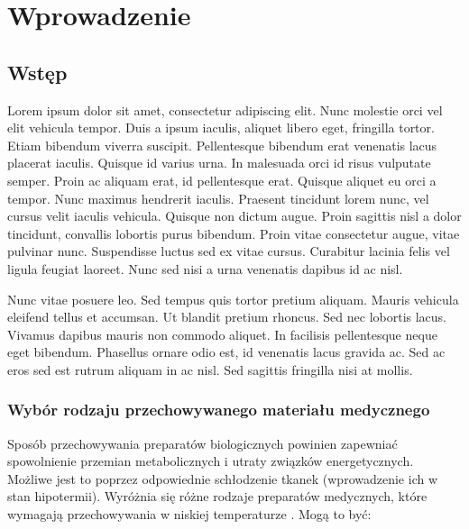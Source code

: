 \chapter{Wprowadzenie}

\section{Wstęp}
Lorem ipsum dolor sit amet, consectetur adipiscing elit. Nunc molestie orci vel elit vehicula tempor. Duis a ipsum iaculis, aliquet libero eget, fringilla tortor. Etiam bibendum viverra suscipit. Pellentesque bibendum erat venenatis lacus placerat iaculis. Quisque id varius urna. In malesuada orci id risus vulputate semper. Proin ac aliquam erat, id pellentesque erat. Quisque aliquet eu orci a tempor. Nunc maximus hendrerit iaculis. Praesent tincidunt lorem nunc, vel cursus velit iaculis vehicula. Quisque non dictum augue. Proin sagittis nisl a dolor tincidunt, convallis lobortis purus bibendum. Proin vitae consectetur augue, vitae pulvinar nunc. Suspendisse luctus sed ex vitae cursus. Curabitur lacinia felis vel ligula feugiat laoreet. Nunc sed nisi a urna venenatis dapibus id ac nisl.

Nunc vitae posuere leo. Sed tempus quis tortor pretium aliquam. Mauris vehicula eleifend tellus et accumsan. Ut blandit pretium rhoncus. Sed nec lobortis lacus. Vivamus dapibus mauris non commodo aliquet. In facilisis pellentesque neque eget bibendum. Phasellus ornare odio est, id venenatis lacus gravida ac. Sed ac eros sed est rutrum aliquam in ac nisl. Sed sagittis fringilla nisi at mollis.



\subsection{Wybór rodzaju przechowywanego materiału medycznego}
Sposób przechowywania preparatów biologicznych powinien zapewniać spowolnienie przemian metabolicznych i utraty związków energetycznych. Możliwe jest to poprzez odpowiednie schłodzenie tkanek (wprowadzenie ich w stan hipotermii). 
Wyróżnia się różne rodzaje preparatów medycznych, które wymagają przechowywania w niskiej temperaturze \cite{Volmer2016}. Mogą to być:

